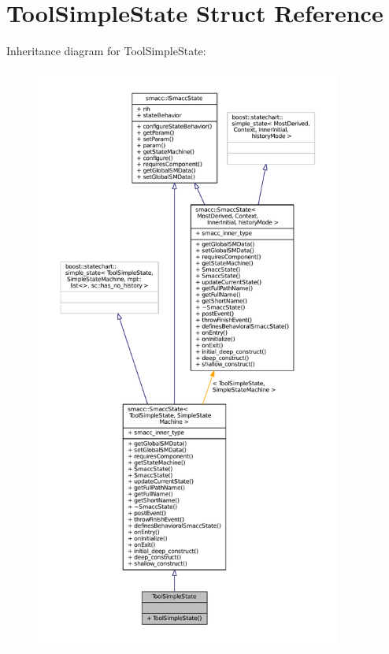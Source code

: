 \hypertarget{structToolSimpleState}{}\section{Tool\+Simple\+State Struct Reference}
\label{structToolSimpleState}


Inheritance diagram for Tool\+Simple\+State\+:
\nopagebreak
\begin{figure}[H]
\begin{center}
\leavevmode
\includegraphics[height=550pt]{structToolSimpleState__inherit__graph}
\end{center}
\end{figure}


